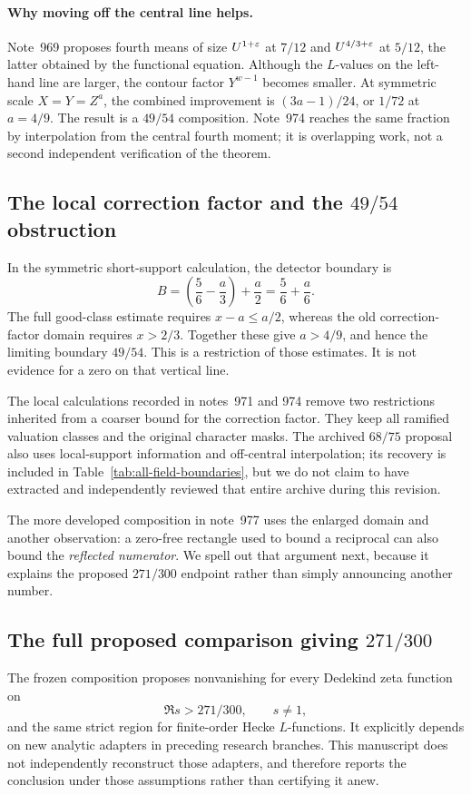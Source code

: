 \paragraph{Why moving off the central line helps.}
Note~969 \cite{R969} proposes fourth means of size $U^{1+\varepsilon}$ at $7/12$ and $U^{4/3+\varepsilon}$ at $5/12$, the latter obtained by the functional equation. Although the $L$-values on the left-hand line are larger, the contour factor $Y^{w-1}$ becomes smaller. At symmetric scale $X=Y=Z^a$, the combined improvement is $(3a-1)/24$, or $1/72$ at $a=4/9$. The result is a $49/54$ composition. Note~974 \cite{R974} reaches the same fraction by interpolation from the central fourth moment; it is overlapping work, not a second independent verification of the theorem.

\subsection{The local correction factor and the $49/54$ obstruction}

In the symmetric short-support calculation, the detector boundary is
\[
 B=\left(\frac56-\frac a3\right)+\frac a2
       =\frac56+\frac a6.
\]
The full good-class estimate requires $x-a\le a/2$, whereas the old correction-factor domain requires $x>2/3$. Together these give $a>4/9$, and hence the limiting boundary $49/54$. This is a restriction of those estimates. It is not evidence for a zero on that vertical line.

The local calculations recorded in notes~971 and 974 \cite{R971,R974} remove two restrictions inherited from a coarser bound for the correction factor. They keep all ramified valuation classes and the original character masks. The archived $68/75$ proposal \cite{R970} also uses local-support information and off-central interpolation; its recovery is included in Table~\ref{tab:all-field-boundaries}, but we do not claim to have extracted and independently reviewed that entire archive during this revision.

The more developed composition in note~977 uses the enlarged domain and another observation: a zero-free rectangle used to bound a reciprocal can also bound the \emph{reflected numerator}. We spell out that argument next, because it explains the proposed $271/300$ endpoint rather than simply announcing another number.

\subsection{The full proposed comparison giving $271/300$}
The frozen composition \cite{R977} proposes nonvanishing for every Dedekind zeta function on
\begin{equation}\label{eq:271}
 \Re s>271/300,\qquad s\ne1,
\end{equation}
and the same strict region for finite-order Hecke $L$-functions. It explicitly depends on new analytic adapters in preceding research branches. This manuscript does not independently reconstruct those adapters, and therefore reports the conclusion under those assumptions rather than certifying it anew.

